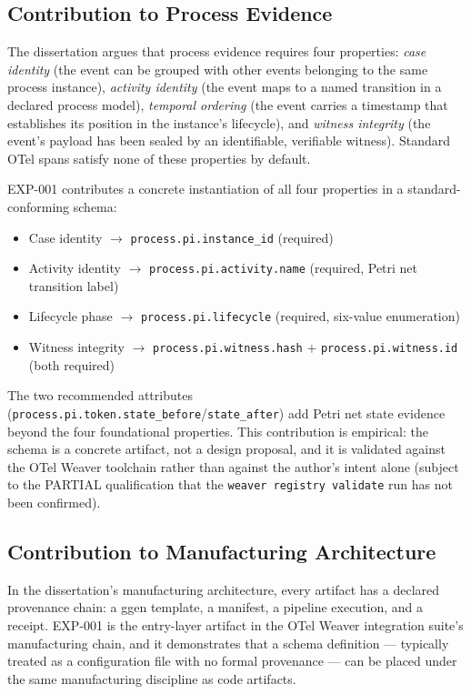 \subsection{Contribution to Process Evidence}
\label{sec:otel-weaver-exp-001-custom-pi-registry-contribution-evidence}

The dissertation argues that process evidence requires four properties: \emph{case identity}
(the event can be grouped with other events belonging to the same process instance),
\emph{activity identity} (the event maps to a named transition in a declared process model),
\emph{temporal ordering} (the event carries a timestamp that establishes its position in the
instance's lifecycle), and \emph{witness integrity} (the event's payload has been sealed by an
identifiable, verifiable witness). Standard OTel spans satisfy none of these properties by
default.

EXP-001 contributes a concrete instantiation of all four properties in a standard-conforming
schema:
\begin{itemize}
  \item Case identity $\to$ \texttt{process.pi.instance\_id} (required)
  \item Activity identity $\to$ \texttt{process.pi.activity.name} (required, Petri net transition label)
  \item Lifecycle phase $\to$ \texttt{process.pi.lifecycle} (required, six-value enumeration)
  \item Witness integrity $\to$ \texttt{process.pi.witness.hash} + \texttt{process.pi.witness.id} (both required)
\end{itemize}

The two recommended attributes (\texttt{process.pi.token.state\_before}/\texttt{state\_after})
add Petri net state evidence beyond the four foundational properties. This contribution is
empirical: the schema is a concrete artifact, not a design proposal, and it is validated against
the OTel Weaver toolchain rather than against the author's intent alone (subject to the PARTIAL
qualification that the \texttt{weaver registry validate} run has not been confirmed).

\subsection{Contribution to Manufacturing Architecture}
\label{sec:otel-weaver-exp-001-custom-pi-registry-contribution-manufacturing}

In the dissertation's manufacturing architecture, every artifact has a declared provenance chain:
a ggen template, a manifest, a pipeline execution, and a receipt. EXP-001 is the entry-layer
artifact in the OTel Weaver integration suite's manufacturing chain, and it demonstrates that a
schema definition --- typically treated as a configuration file with no formal provenance --- can
be placed under the same manufacturing discipline as code artifacts.


